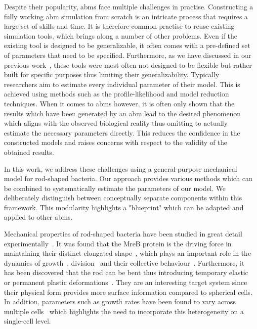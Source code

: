\documentclass{article}
\begin{document}
Despite their popularity, \acp{abm} face multiple challenges in practise.
Constructing a fully working \ac{abm} simulation from scratch is an intricate process that requires
a large set of skills and time.
It is therefore common practise to reuse existing simulation tools, which brings along a number of
other problems.
Even if the existing tool is designed to be generalizable, it often comes with a pre-defined set
of parameters that need to be specified.
Furthermore, as we have discussed in our previous work~\cite{Pleyer2023}, these tools were most
often not designed to be flexible but rather built for specific purposes thus limiting their
generalizability.
Typically researchers aim to estimate every individual parameter of their model.
This is achieved using methods such as the profile-likelihood and model reduction techniques.
When it comes to \acp{abm} however, it is often only shown that the results which have been
generated by an \ac{abm} lead to the desired phenomenon which aligns with the observed biological
reality thus omitting to actually estimate the necessary parameters directly.
This reduces the confidence in the constructed models and raises concerns with respect to the
validity of the obtained results.

In this work, we address these challenges using a general-purpose mechanical model for rod-shaped
bacteria.
Our approach provides various methods which can be combined to systematically estimate the
parameters of our model.
We deliberately distinguish between conceptually separate components within this framework.
This modularity highlights a "blueprint" which can be adapted and applied to other \acp{abm}.

Mechanical properties of rod-shaped bacteria have been studied in great detail
experimentally~\cite{Chatterjee1988,Takeuchi2005,IWAI2002}.
It was found that the MreB protein is the driving force in maintaining their distinct elongated
shape~\cite{Ursell2014}, which plays an important role in the dynamics of
growth~\cite{Billaudeau2017}, division~\cite{Harry2001} and their collective
behaviour~\cite{vanGestel2015}.
Furthermore, it has been discovered that the rod can be bent thus introducing temporary elastic or
permanent plastic deformations~\cite{Amir2014_2}.
They are an interesting target system since their physical form provides more surface information
compared to spherical cells.
In addition, parameters such as growth rates have been found to vary across multiple
cells~\cite{Koutsoumanis2013} which highlights the need to incorporate this heterogeneity on a
single-cell level.
\end{document}
